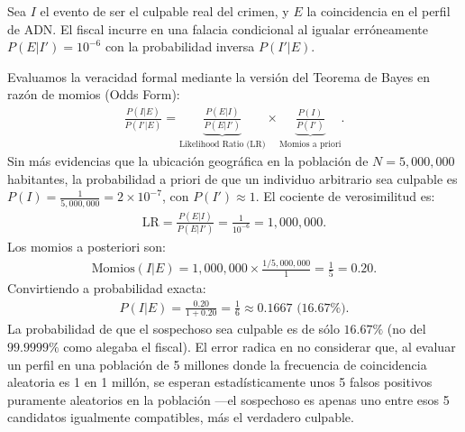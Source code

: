 \begin{solproblema}[prob:898898e]
	Sea $I$ el evento de ser el culpable real del crimen, y $E$ la coincidencia en el perfil de ADN. El fiscal incurre en una falacia condicional al igualar erróneamente $P(E|I') = 10^{-6}$ con la probabilidad inversa $P(I'|E)$.

	Evaluamos la veracidad formal mediante la versión del Teorema de Bayes en razón de momios (Odds Form):
	\begin{align}
		\frac{P(I|E)}{P(I'|E)} = \underbrace{\frac{P(E|I)}{P(E|I')}}_{\text{Likelihood Ratio (LR)}} \times \underbrace{\frac{P(I)}{P(I')}}_{\text{Momios a priori}}.
	\end{align}
	Sin más evidencias que la ubicación geográfica en la población de $N = 5,000,000$ habitantes, la probabilidad a priori de que un individuo arbitrario sea culpable es $P(I) = \frac{1}{5,000,000} = 2 \times 10^{-7}$, con $P(I') \approx 1$. El cociente de verosimilitud es:
	\begin{align}
		\text{LR} = \frac{P(E|I)}{P(E|I')} = \frac{1}{10^{-6}} = 1,000,000.
	\end{align}
	Los momios a posteriori son:
	\begin{align}
		\text{Momios}(I|E) = 1,000,000 \times \frac{1/5,000,000}{1} = \frac{1}{5} = 0.20.
	\end{align}
	Convirtiendo a probabilidad exacta:
	\begin{align}
		P(I|E) = \frac{0.20}{1+0.20} = \frac{1}{6} \approx 0.1667 \text{ (16.67\%).}
	\end{align}
	La probabilidad de que el sospechoso sea culpable es de sólo $16.67\%$ (no del $99.9999\%$ como alegaba el fiscal). El error radica en no considerar que, al evaluar un perfil en una población de 5 millones donde la frecuencia de coincidencia aleatoria es 1 en 1 millón, se esperan estadísticamente unos 5 falsos positivos puramente aleatorios en la población —el sospechoso es apenas uno entre esos 5 candidatos igualmente compatibles, más el verdadero culpable.
\end{solproblema}

